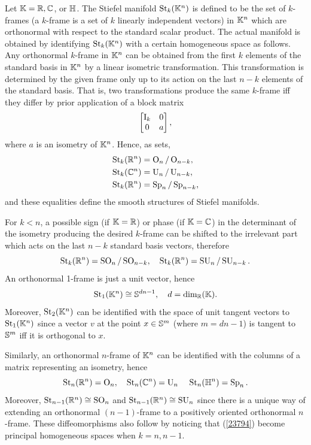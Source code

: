 \begin{defn}\label{def stiefel manifolds}
    Let $\mathbb{K}=\mathbb{R},\mathbb{C}$, or $\mathbb{H}$. The Stiefel manifold $\operatorname{St}_k(\mathbb{K}^n)$ is defined to be the set of $k$-frames (a $k$-frame is a set of $k$ linearly independent vectors) in $\mathbb{K}^n$ which are orthonormal with respect to the standard scalar product. The actual manifold is obtained by identifying $\operatorname{St}_k(\mathbb{K}^n)$ with a certain homogeneous space as follows. Any orthonormal $k$-frame in $\mathbb{K}^n$ can be obtained from the first $k$ elements of the standard basis in $\mathbb{K}^n$ by a linear isometric transformation. This transformation is determined by the given frame only up to its action on the last $n-k$ elements of the standard basis. That is, two transformations produce the same $k$-frame iff they differ by prior application of a block matrix 
    \[\begin{bmatrix}
        \mathrm{I}_k&0\\0&a
    \end{bmatrix}, \]
    where $a$ is an isometry of $\mathbb{K}^n$. Hence, as sets,
    \begin{align}
        \operatorname{St}_k(\mathbb{R}^n)&=\operatorname{O}_n\slash \operatorname{O}_{n-k},\\
        \operatorname{St}_k(\mathbb{C}^n)&=\operatorname{U}_n\slash \operatorname{U}_{n-k},\\
        \operatorname{St}_k(\mathbb{R}^n)&=\operatorname{Sp}_n\slash \operatorname{Sp}_{n-k},
    \end{align}
    and these equalities define the smooth structures of Stiefel manifolds.
\end{defn}
\begin{rem}
    For $k<n$, a possible sign (if $\mathbb{K}=\mathbb{R}$) or phase (if $\mathbb{K}=\mathbb{C}$) in the determinant of the isometry producing the desired $k$-frame can be shifted to the irrelevant part which acts on the last $n-k$ standard basis vectors, therefore
    \[\operatorname{St}_k(\mathbb{R}^n)=\operatorname{SO}_n\slash \operatorname{SO}_{n-k},\quad \operatorname{St}_k(\mathbb{R}^n)=\operatorname{SU}_n\slash \operatorname{SU}_{n-k}.\label{23794}\]
    An orthonormal 1-frame is just a unit vector, hence
    \[\operatorname{St}_1(\mathbb{K}^n)\cong \mathbb{S}^{dn-1},\quad d=\dim_{\mathbb{R}}(\mathbb{K}).\]
    Moreover, $\operatorname{St}_2(\mathbb{K}^n)$ can be identified with the space of unit tangent vectors to $\operatorname{St}_1(\mathbb{K}^n)$  since a vector $v$ at the point $x\in \mathbb{S}^m$ (where $m=dn-1$) is tangent to $\mathbb{S}^m$ iff it is orthogonal to $x$.
    
    Similarly, an orthonormal $n$-frame of $\mathbb{K}^n$ can be identified with the columns of a matrix representing an isometry, hence
    \[\operatorname{St}_n(\mathbb{R}^n)=\operatorname{O}_n,\quad \operatorname{St}_n(\mathbb{C}^n)=\operatorname{U}_n\, \quad \operatorname{St}_n(\mathbb{H}^n)=\operatorname{Sp}_n.\]
    Moreover, $\operatorname{St}_{n-1}(\mathbb{R}^n)\cong \operatorname{SO}_n$ and $\operatorname{St}_{n-1}(\mathbb{R}^n)\cong \operatorname{SU}_n$ since there is a unique way of extending an orthonormal $(n-1)$-frame to a positively oriented orthonormal $n$-frame. These diffeomorphisms also follow by noticing that (\ref{23794}) become principal homogeneous spaces when $k=n,n-1$.
\end{rem}



